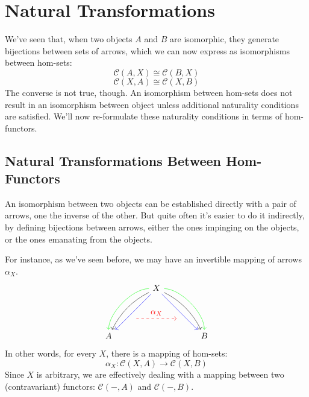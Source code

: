 \documentclass[DaoFP]{subfiles}
\begin{document}
\setcounter{chapter}{8}

\chapter{Natural Transformations}

We've seen that, when two objects $A$ and $B$ are isomorphic, they generate bijections between sets of arrows, which we can now express as isomorphisms between hom-sets:
\[\mathcal{C}(A, X) \cong \mathcal{C}(B, X)\]
\[\mathcal{C}(X, A) \cong \mathcal{C}(X, B)\]
The converse is not true, though. An isomorphism between hom-sets does not result in an isomorphism between object unless additional naturality conditions are satisfied. We'll now re-formulate these naturality conditions in terms of hom-functors.

\section{Natural Transformations Between Hom-Functors}

An isomorphism between two objects can be established directly with a pair of arrows, one the inverse of the other. But quite often it's easier to do it indirectly, by defining bijections between arrows, either the ones impinging on the objects, or the ones emanating from the objects. 

For instance, as we've seen before, we may have an invertible mapping of arrows $\alpha_X$.
\[
 \begin{tikzcd}
 \node(x) at (0, 2) {X};
 \node(a) at (-2, 0) {A};
 \node(b) at (2, 0) {B};
 \node(c1) at (-1, 1.5) {};
 \node(c2) at (-1.5, 1) {};
 \node(c3) at (-1, 2) {};
 \node(c4) at (-2, 1) {};
 \node(d1) at (1, 1.5) {};
 \node(d2) at (1.5, 1) {};
 \node(d3) at (1, 2) {};
 \node(d4) at (2, 1) {};
\node (aa) at (-1, 0.75) {};
 \node (bb) at (1, 0.75) {};
 \draw[->] (x) .. controls (c1)  and (c2) .. (a); %
 \draw[->, green] (x) .. controls (c3)  and (c4) .. (a); %
 \draw[->, blue] (x) -- (a); 
  \draw[->] (x) .. controls (d1)  and (d2) .. (b); %
 \draw[->, green] (x) .. controls (d3)  and (d4) .. (b); %
 \draw[->, blue] (x) -- (b); 
 \draw[->, red, dashed] (aa) -- node[above]{\alpha_X} (bb);
 \end{tikzcd}
\]
In other words, for every $X$, there is a mapping of hom-sets:
\[ \alpha_X \colon \mathcal{C}(X, A) \to \mathcal{C}(X, B) \]
Since $X$ is arbitrary, we are effectively dealing with a mapping between two (contravariant) functors:  $\mathcal{C}(-, A)$ and $\mathcal{C}(-, B)$. 
\end{document}
